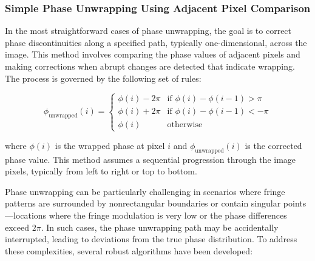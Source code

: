 \documentclass[../main.tex]{subfiles}
\begin{document}
\subsubsection{Simple Phase Unwrapping Using Adjacent Pixel Comparison}
In the most straightforward cases of phase unwrapping, the goal is to correct phase discontinuities along a specified path, typically one-dimensional, across the image. This method involves comparing the phase values of adjacent pixels and making corrections when abrupt changes are detected that indicate wrapping. The process is governed by the following set of rules:

\begin{equation}
    \phi_{\text{unwrapped}}(i) = 
    \begin{cases} 
    \phi(i) - 2\pi & \text{if } \phi(i) - \phi(i-1) > \pi \\
    \phi(i) + 2\pi & \text{if } \phi(i) - \phi(i-1) < -\pi \\
    \phi(i) & \text{otherwise}
    \end{cases}
\end{equation}

where \( \phi(i) \) is the wrapped phase at pixel \( i \) and \( \phi_{\text{unwrapped}}(i) \) is the corrected phase value. This method assumes a sequential progression through the image pixels, typically from left to right or top to bottom.

Phase unwrapping can be particularly challenging in scenarios where fringe patterns are surrounded by nonrectangular boundaries or contain singular points—locations where the fringe modulation is very low or the phase differences exceed \(2\pi\). In such cases, the phase unwrapping path may be accidentally interrupted, leading to deviations from the true phase distribution. To address these complexities, several robust algorithms have been developed:
\end{document}
